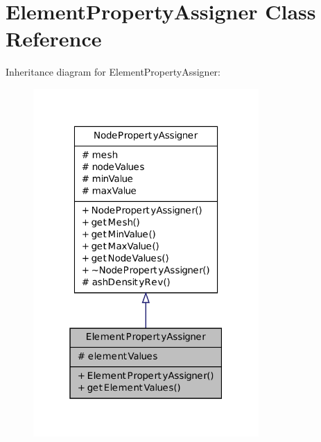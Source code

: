\hypertarget{class_element_property_assigner}{
\section{ElementPropertyAssigner Class Reference}
\label{class_element_property_assigner}
}


Inheritance diagram for ElementPropertyAssigner:
\nopagebreak
\begin{figure}[H]
\begin{center}
\leavevmode
\includegraphics[width=244pt]{class_element_property_assigner__inherit__graph}
\end{center}
\end{figure}


